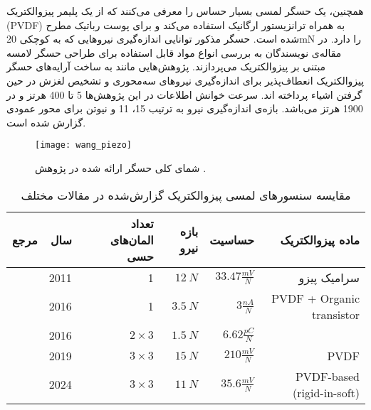  همچنین،
  \cite{spanu2016PVDF}
   یک حسگر لمسی بسیار حساس را معرفی می‌کنند که از یک پلیمر پیزوالکتریک (PVDF) به همراه ترانزیستور ارگانیک استفاده می‌کند و برای پوست رباتیک مطرح شده است. حسگر مذکور توانایی اندازه‌گیری نیروهایی که به کوچکی 20mN را دارد.
   در مقاله‌ی 
   \cite{qi2023PVDF}
نویسندگان به بررسی انواع مواد قابل استفاده برای طراحی حسگر لامسه مبتنی بر پیزوالکتریک می‌پردازند.
    پژوهش‌هایی مانند
 \cite{wang2019PiezoArray,huang2024piezo,yu2016PiezoArray}
   به ساخت آرایه‌های حسگر پیزوالکتریک انعطاف‌پذیر برای اندازه‌گیری نیروهای سه‌محوری و تشخیص لغزش در حین گرفتن اشیاء پرداخته اند. سرعت خوانش اطلاعات در این پژوهش‌ها 5 تا 400 هرتز و در 
   \cite{huang2024piezo}
   1900 هرتز می‌باشد. بازه‌ی اندازه‌گیری نیرو به ترتیب 15، 11 و  نیوتن برای محور عمودی گزارش شده است.
   
\begin{figure}[t]
	\centering
	\texttt{[image: wang\_piezo]}
	\caption{شمای کلی حسگر ارائه شده در پژوهش 
		\cite{wang2019PiezoArray}
		. }
	\label{fig:wang_piezo}
\end{figure}
   
\begin{table}[ht]
	\centering
	\caption{مقایسه سنسورهای لمسی پیزوالکتریک گزارش‌شده در مقالات مختلف}
	\label{tab:piezo_sensors}
	\onehalfspacing
	\begin{tabular}{|r|r|r|r|r|r|}
		\hline
		\textbf{مرجع} & \textbf{سال} & \textbf{تعداد المان‌های حسی}  & \textbf{بازه نیرو} & \textbf{حساسیت} & \textbf{ماده پیزوالکتریک} \\ \hline \hline
		
		\cite{nasserii2011Piezo} & 2011 & 1 &$12 \: N$ & $33.47 \frac{mV}{N}$ & سرامیک پیزو \\ \hline
		
		\cite{spanu2016PVDF} & 2016 & 1 & 
		 $3.5 \: N$ & $3 \frac{nA}{N}$ & PVDF + Organic transistor \\ \hline
		
		\cite{yu2016PiezoArray} & 2016 & $2 \times 3 $ & $1.5 \: N$ & 
		$6.62 \frac{pC}{N}$ & \LR{PVDF} \\ \hline
		
		\cite{wang2019PiezoArray} & 2019 & $3 \times 3 $& $15 \: N$ &  $210 \frac{mV}{N}$ & PVDF \\ \hline
		
		\cite{huang2024piezo} & 2024 &$ 3‌ \times 3 $& $11 \: N$ & $35.6 \frac{mV}{N}$ & PVDF-based (rigid-in-soft) \\ \hline
		
	\end{tabular}
\end{table}

